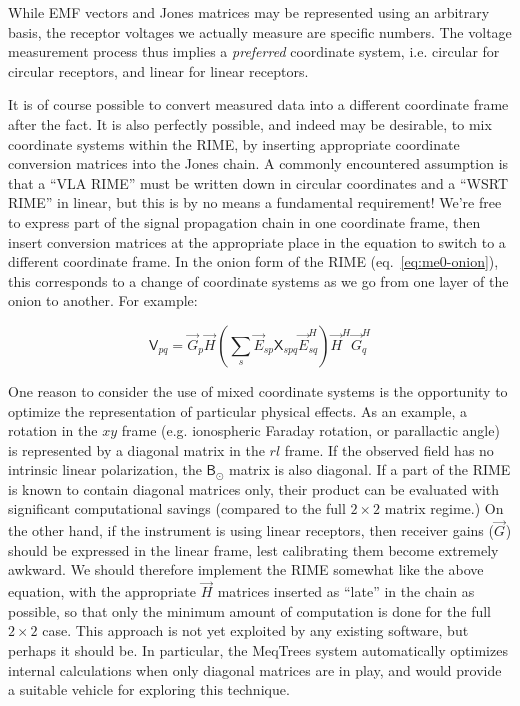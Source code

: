\documentclass[]{aa}
\newcommand{\herm}{H}
\newcommand{\jones}[2]{\vec {#1}_{#2}}
\newcommand{\jonesT}[2]{\vec {#1}^{\herm}_{#2}}
\newcommand{\coh}[2]{\mathsf{{#1}}_{{#2}}}
\begin{document}
While EMF vectors and Jones matrices may be represented using an arbitrary basis, the receptor voltages we actually measure are specific numbers. The voltage measurement process thus implies a {\em preferred} coordinate system, i.e. circular for circular receptors, and linear for linear receptors. 

It is of course possible to convert measured data into a different coordinate frame after the fact. It is also perfectly possible, and indeed may be desirable, to mix coordinate systems within the RIME, by inserting appropriate coordinate conversion matrices into the Jones chain. A commonly encountered assumption is that a ``VLA RIME'' must be written down in circular coordinates and a ``WSRT RIME'' in linear, but this is by no means a fundamental requirement! We're free to express part of the signal propagation chain in one coordinate frame, then insert conversion matrices at the appropriate place in the equation to switch to a different coordinate frame. In the onion form of the RIME (eq.~\ref{eq:me0-onion}), this corresponds to a change of coordinate systems as we go from one layer of the onion to another. For example:

\[
\coh{V}{pq} = \jones{G}{p} \jones{H}{} \left ( \sum_{s} \jones{E}{sp} \coh{X}{spq} 
\jonesT{E}{sq} \right ) \jonesT{H}{} \jonesT{G}{q}
\] 

One reason to consider the use of mixed coordinate systems is the opportunity to optimize the representation of particular physical effects. As an example, a rotation in the $xy$ frame (e.g. ionospheric Faraday rotation, or parallactic angle) is represented by a diagonal matrix in the $rl$ frame. If the observed field has no intrinsic linear polarization, the $\coh{B}{\odot}$ matrix is also diagonal. If a part of the RIME is known to contain diagonal matrices only, their product can be evaluated with significant computational savings (compared to the full $2\times2$ matrix regime.) On the other hand, if the instrument is using linear receptors, then receiver gains ($\jones{G}{}$) should be expressed in the linear frame, lest calibrating them become extremely awkward. We should therefore implement the RIME somewhat like the above equation, with the appropriate $\jones{H}{}$ matrices inserted as ``late'' in the chain as possible, so that only the minimum amount of computation is done for the full $2\times2$ case. This approach is not yet exploited by any existing software, but perhaps it should be. In particular, the MeqTrees system \citep{meqtrees} automatically optimizes internal calculations when only diagonal matrices are in play, and would provide a suitable vehicle for exploring this technique.
\end{document}

